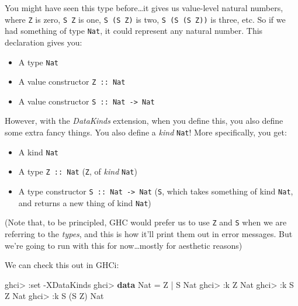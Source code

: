 \documentclass[]{article}
\newenvironment{Shaded}{}{}
\newcommand{\KeywordTok}[1]{\textcolor[rgb]{0.00,0.44,0.13}{\textbf{{#1}}}}
\newcommand{\DataTypeTok}[1]{\textcolor[rgb]{0.56,0.13,0.00}{{#1}}}
\newcommand{\FunctionTok}[1]{\textcolor[rgb]{0.02,0.16,0.49}{{#1}}}
\newcommand{\NormalTok}[1]{{#1}}
\begin{document}
You might have seen this type before\ldots{}it gives us value-level
natural numbers, where \texttt{Z} is zero, \texttt{S\ Z} is one,
\texttt{S\ (S\ Z)} is two, \texttt{S\ (S\ (S\ Z))} is three, etc. So if
we had something of type \texttt{Nat}, it could represent any natural
number. This declaration gives you:

\begin{itemize}
\tightlist
\item
  A type \texttt{Nat}
\item
  A value constructor \texttt{Z\ ::\ Nat}
\item
  A value constructor \texttt{S\ ::\ Nat\ -\textgreater{}\ Nat}
\end{itemize}

However, with the \emph{DataKinds} extension, when you define this, you
also define some extra fancy things. You also define a \emph{kind}
\texttt{Nat}! More specifically, you get:

\begin{itemize}
\tightlist
\item
  A kind \texttt{Nat}
\item
  A type \texttt{Z\ ::\ Nat} (\texttt{Z}, of \emph{kind} \texttt{Nat})
\item
  A type constructor \texttt{S\ ::\ Nat\ -\textgreater{}\ Nat}
  (\texttt{S}, which takes something of kind \texttt{Nat}, and returns a
  new thing of kind \texttt{Nat})
\end{itemize}

(Note that, to be principled, GHC would prefer us to use
\texttt{\textquotesingle{}Z} and \texttt{\textquotesingle{}S} when we
are referring to the \emph{types}, and this is how it'll print them out
in error messages. But we're going to run with this for
now\ldots{}mostly for aesthetic reasons)

We can check this out in GHCi:

\begin{Shaded}
\begin{Highlighting}[]
\NormalTok{ghci}\FunctionTok{>} \FunctionTok{:}\NormalTok{set }\FunctionTok{-}\DataTypeTok{XDataKinds}
\NormalTok{ghci}\FunctionTok{>} \KeywordTok{data} \DataTypeTok{Nat} \FunctionTok{=} \DataTypeTok{Z} \FunctionTok{|} \DataTypeTok{S} \DataTypeTok{Nat}
\NormalTok{ghci}\FunctionTok{>} \FunctionTok{:}\NormalTok{k }\DataTypeTok{Z}
\DataTypeTok{Nat}
\NormalTok{ghci}\FunctionTok{>} \FunctionTok{:}\NormalTok{k }\DataTypeTok{S} \DataTypeTok{Z}
\DataTypeTok{Nat}
\NormalTok{ghci}\FunctionTok{>} \FunctionTok{:}\NormalTok{k }\DataTypeTok{S} \NormalTok{(}\DataTypeTok{S} \DataTypeTok{Z}\NormalTok{)}
\DataTypeTok{Nat}
\end{Highlighting}
\end{Shaded}
\end{document}
